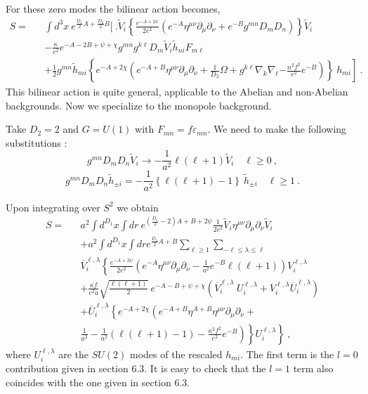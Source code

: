 \documentclass[a4paper,12pt]{article}
\begin{document}
\begin{appendix}
For these zero modes the bilinear action becomes,
\begin{eqnarray*}
S = &&\int d^3 x\ e^{\frac{D_1}{2} A+ \frac{D_2}{2} B}\biggl[\ \biggr.
\tilde V_i\left\{ \frac{e^{-A+2\psi}}{2e^2}  \left(
e^{-A}\eta^{\mu\nu} \partial_\mu \partial_\nu +e^{-B} g^{mn} D_m
D_n\right)\right\}\tilde V_i
\\[3mm]
&&-\frac{\kappa}{e^2} e^{-A-2B+\psi+\chi} g^{mn} g^{k\ell} D_m \tilde
V_i \tilde h_{ni} F_{m\ell}
\\[3mm]
&&+\frac{1}{2} g^{mn} \tilde h_{mi}\left\{
e^{-A+2\chi}\left(e^{-A+B}\eta^{\mu\nu}\partial_\mu\partial_\nu
+\frac{1}{D_2} \Omega +g^{k\ell}\nabla_k\nabla_\ell \left.
-\frac{n^{2}f^2}{e^2}  e^{-B}\right)\right\}\ h_{mi}\right]~.
\end{eqnarray*}
This bilinear action is quite general, applicable to the Abelian and
non-Abelian backgrounds. Now we specialize to the monopole
background.

Take $D_2 = 2$ and $G=U(1)$ with $F_{mn} = f\varepsilon_{mn}$. We
need to make the following substitutions \cite{Randjbar-Daemi:1982hi}:
\begin{equation}
g^{mn}D_mD_n \tilde V_i\to -\frac{1}{a^2} \ell(\ell +1)\tilde V_i\quad
\ell\geq 0~,
\end{equation}
\begin{equation}
g^{mn} D_m D_n \tilde h_{\pm i} = -\frac{1}{a^2} \left\{\ell (\ell
+1)-1\right\}\ \tilde h_{\pm i}\quad \ell \geq 1~.
\end{equation}

Upon integrating over $S^2$ we obtain
\begin{eqnarray*}
S = &&a^2 \int d^{D_1} x \int dr \ e^{\left({\frac{D_1}{2} -
2}\right)A+B+2\psi}\frac{1}{2e^2} \tilde V_i\eta^{\mu\nu}
\partial_\mu\partial_\nu \tilde V_i
\\[3mm]
&&+a^2\int d^{D_1}x \int dr e^{\frac{D_1}{2}A+B} \sum_{\ell\geq
1}\sum_{-\ell\leq \lambda\leq\ell}
\\[3mm]
&&
\overline V_i^{\ell,\lambda} \left\{   \frac{e^{-A+2\psi}}{2e^2}
\left(e^{-A}\eta^{\mu\nu}\partial_\mu\partial_\nu -\frac{1}{a^2}
e^{-B}\ell(\ell+1)\right) V^{\ell,\lambda}_i\right.
\\[3mm]
&&+\frac{\kappa f}{e^2a} \sqrt{\frac{\ell(\ell+1)}{2} }\
e^{-A-B+\psi+\chi}\left(\overline V_i^{\ell,\lambda}\
U^{\ell,\lambda}_i +V^{\ell,\lambda}_i \overline
U^{\ell,\lambda}_i\right)
\\[3mm]
&&+\overline U^{\ell,\lambda}_i\left\{ e^{-A+2\chi} \left ( e^{-A+B}
\eta^{A+B}\eta^{\mu\nu}\partial_\mu\partial_\nu +\right.\right.
\\[3mm]
&&\left.\left.\left.\frac{1}{a^2} - \frac{1}{a^2}
\left(\ell(\ell+1)-1\right)- \frac{\kappa^2f^2}{e^2}
e^{-B}\right)\right\} U^{\ell,\lambda}_i\right\}~,
\end{eqnarray*}
where $U^{\ell,\lambda}_{i}$ are the $SU(2)$ modes of the rescaled
$h_{mi}$. The first term is the $l=0$  contribution given in section
6.3. It is easy to check that the $l=1$ term  also coincides with the
one given in section 6.3.


\end{appendix}
\end{document}
